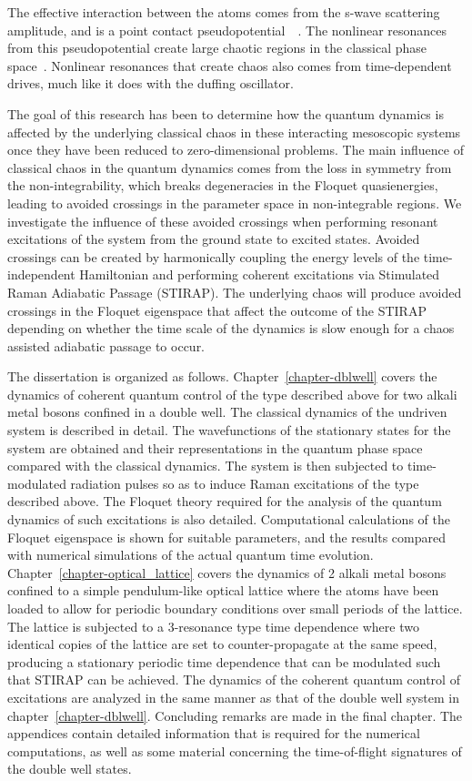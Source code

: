 The effective interaction between the atoms comes from the s-wave scattering amplitude, and is a point contact pseudopotential~\cite{metcalf:vanderstraten}~\cite{pethick:bec}. The nonlinear resonances from this pseudopotential create large chaotic regions in the classical phase space~\cite{reichl}. Nonlinear resonances that create chaos also comes from time-dependent drives, much like it does with the duffing oscillator. 

The  goal of this research has been to determine how the quantum dynamics is affected by the underlying classical chaos in these interacting mesoscopic systems once they have been reduced to zero-dimensional problems. The main influence of classical chaos in the quantum dynamics comes from the loss in symmetry from the non-integrability, which breaks degeneracies in the Floquet quasienergies, leading to avoided crossings in the parameter space in non-integrable regions. We investigate the influence of these avoided crossings when performing resonant excitations of the system from the ground state to excited states. Avoided crossings can be created by harmonically coupling the energy levels of the time-independent Hamiltonian and performing coherent excitations via Stimulated Raman Adiabatic Passage (STIRAP). The underlying chaos will produce avoided crossings in the Floquet eigenspace that affect the outcome of the STIRAP depending on whether the time scale of the dynamics is slow enough for a chaos assisted adiabatic passage to occur.

The dissertation is organized as follows. Chapter~\ref{chapter-dblwell} covers the dynamics of coherent quantum control of the type described above for two alkali metal bosons confined in a double well. The classical dynamics of the undriven system is described in detail. The wavefunctions of the stationary states for the system are obtained and their representations in the quantum phase space compared with the classical dynamics. The system is then subjected to time-modulated radiation pulses so as to induce Raman excitations of the type described above. The Floquet theory required for the analysis of the quantum dynamics of such excitations is also detailed. Computational calculations of the Floquet eigenspace is shown for suitable parameters, and the results compared with numerical simulations of the actual quantum time evolution. Chapter~\ref{chapter-optical_lattice} covers the dynamics of 2 alkali metal bosons confined to a simple pendulum-like optical lattice where the atoms have been loaded to allow for periodic boundary conditions over small periods of the lattice. The lattice is subjected to a 3-resonance type time dependence where two identical copies of the lattice are set to counter-propagate at the same speed, producing a stationary periodic time dependence that can be modulated such that STIRAP can be achieved. The dynamics of the coherent quantum control of excitations are analyzed in the same manner as that of the double well system in chapter~\ref{chapter-dblwell}. Concluding remarks are made in the final chapter. The appendices contain detailed information that is required for the numerical computations, as well as some material concerning the time-of-flight signatures of the double well states.

